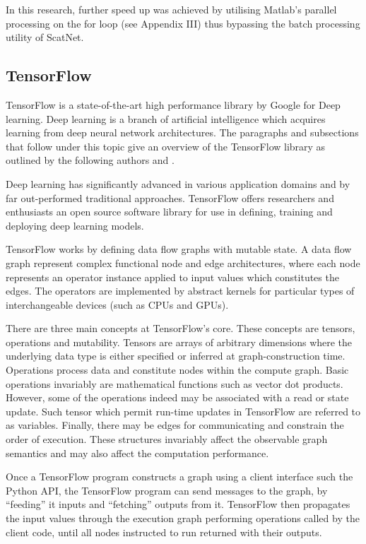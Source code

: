 In this research, further speed up was achieved by utilising Matlab’s parallel processing on the for loop (see Appendix III) thus bypassing the batch processing utility of ScatNet.

\subsection{TensorFlow}\label{sec_c3_tf}
TensorFlow is a state-of-the-art high performance library by Google for Deep learning.  Deep learning is a branch of artificial intelligence which acquires learning from deep neural network architectures.  The paragraphs and subsections that follow under this topic give an overview of the TensorFlow library as outlined by the following authors \cite{goldsborough2016tour,abadi2016tensorflow} and \cite{abadi2017computational}.

Deep learning has significantly advanced in various application domains and by far out-performed traditional approaches.  TensorFlow offers researchers and enthusiasts an open source software library for use in defining, training and deploying deep learning models.

TensorFlow works by defining data flow graphs with mutable state.  A data flow graph represent complex functional node and edge architectures, where each node represents an operator instance applied to input values which constitutes the edges. The operators are implemented by abstract kernels for particular types of interchangeable devices (such as CPUs and GPUs)\citep{abadi2017computational}.

There are three main concepts at TensorFlow's core.  These concepts are tensors, operations and mutability.  Tensors are arrays of arbitrary dimensions where the underlying data type is either specified or inferred at graph-construction time. Operations process data and constitute nodes within the compute graph. Basic operations invariably are mathematical functions such as vector dot products.  However, some of the operations indeed may be associated with a read or state update. Such tensor which permit run-time updates in TensorFlow are referred to as variables.  Finally, there may be edges for communicating and constrain the order of execution. These structures invariably affect the observable graph semantics and may also affect the computation performance. 

Once a TensorFlow program constructs a graph using a client interface such the Python API, the TensorFlow program can send messages to the graph, by “feeding” it inputs and “fetching” outputs from it. TensorFlow then propagates the input values through the execution graph performing  operations called by the client code, until all nodes instructed to run returned with their outputs. 

